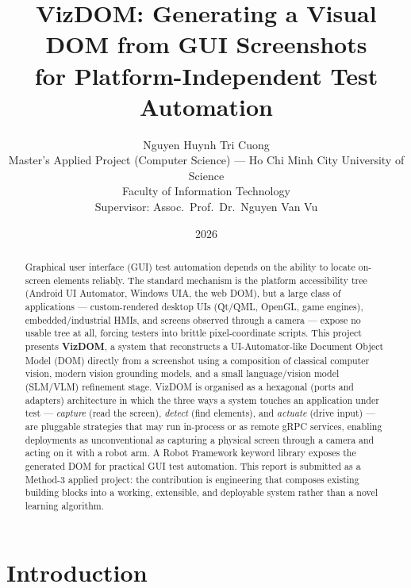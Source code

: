 \documentclass[11pt,a4paper]{article}
\title{\textbf{VizDOM: Generating a Visual DOM from GUI Screenshots\\
for Platform-Independent Test Automation}}
\author{Nguyen Huynh Tri Cuong\\
\small Master's Applied Project (Computer Science) --- Ho Chi Minh City University of Science\\
\small Faculty of Information Technology\\
\small Supervisor: Assoc.\ Prof.\ Dr.\ Nguyen Van Vu}
\date{2026}
\begin{document}
\maketitle

\begin{abstract}
\noindent
Graphical user interface (GUI) test automation depends on the ability to locate
on-screen elements reliably. The standard mechanism is the platform accessibility
tree (Android UI Automator, Windows UIA, the web DOM), but a large class of
applications --- custom-rendered desktop UIs (Qt/QML, OpenGL, game engines),
embedded/industrial HMIs, and screens observed through a camera --- expose no
usable tree at all, forcing testers into brittle pixel-coordinate scripts.
This project presents \textbf{VizDOM}, a system that reconstructs a
UI-Automator-like Document Object Model (DOM) directly from a screenshot using a
composition of classical computer vision, modern vision grounding models, and a
small language/vision model (SLM/VLM) refinement stage. VizDOM is organised as a
hexagonal (ports and adapters) architecture in which the three ways a system
touches an application under test --- \emph{capture} (read the screen),
\emph{detect} (find elements), and \emph{actuate} (drive input) --- are pluggable
strategies that may run in-process or as remote gRPC services, enabling
deployments as unconventional as capturing a physical screen through a camera and
acting on it with a robot arm. A Robot Framework keyword library exposes the
generated DOM for practical GUI test automation. This report is submitted as a
Method-3 applied project: the contribution is engineering that composes existing
building blocks into a working, extensible, and deployable system rather than a
novel learning algorithm.
\end{abstract}

\newpage
\tableofcontents
\newpage

\section{Introduction}
\end{document}
